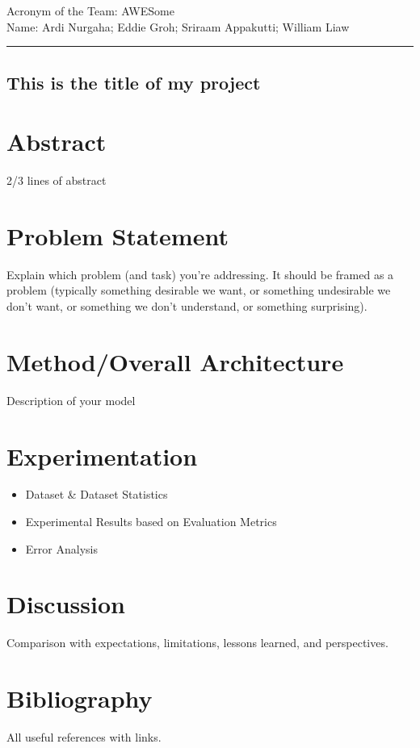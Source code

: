 \documentclass[12pt,a4paper]{article}
\begin{document}
\noindent Acronym of the Team: AWESome\\
Name: Ardi Nurgaha; Eddie Groh; Sriraam Appakutti; William Liaw

    {\centering\rule{\linewidth}{.5pt}}


\begin{center}
    \section*{This is the title of my project}
\end{center}
\section*{Abstract}

2/3 lines of abstract

\section*{Problem Statement}

Explain which problem (and task) you're addressing.
It should be framed as a problem (typically something desirable we want, or something undesirable we don't want, or something we don't understand, or something surprising).

\section*{Method/Overall Architecture}

Description of your model

\section*{Experimentation}

\begin{itemize}
    \item Dataset \& Dataset Statistics
    \item Experimental Results based on Evaluation Metrics
    \item Error Analysis
\end{itemize}

\section*{Discussion}

Comparison with expectations, limitations, lessons learned, and perspectives.

\section*{Bibliography}

All useful references with links.
\end{document}
